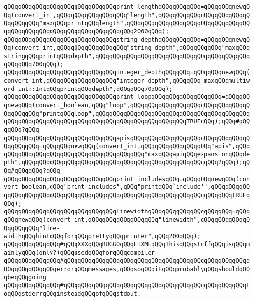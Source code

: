 \verb|qQQqqQQqqQQqqQQqqQQqqQQqqQQqqQQqprint_lengthqQQqqQQqqQQq=qQQqqQQqnewqQQq(convert_int,qQQqqQQqqQQqqQQqqQQq"length",qQQqqQQqqQQqqQQqqQQqqQQqqQQqqQQqqQQq"maxqQQqprintqQQqlength",qQQqqQQqqQQqqQQqqQQqqQQqqQQqqQQqqQQqqQQqqQQqqQQqqQQqqQQqqQQqqQQqqQQqqQQq2000qQQq);|\newline
\verb|qQQqqQQqqQQqqQQqqQQqqQQqqQQqqQQqstring_depthqQQqqQQqqQQq=qQQqqQQqnewqQQq(convert_int,qQQqqQQqqQQqqQQqqQQq"string_depth",qQQqqQQqqQQq"maxqQQqstringqQQqprintqQQqdepth",qQQqqQQqqQQqqQQqqQQqqQQqqQQqqQQqqQQqqQQqqQQqqQQqqQQq700qQQq);|\newline
\verb|qQQqqQQqqQQqqQQqqQQqqQQqqQQqqQQqinteger_depthqQQqqQQq=qQQqqQQqnewqQQq(convert_int,qQQqqQQqqQQqqQQqqQQq"integer_depth",qQQqqQQq"maxqQQqmultiword_int::IntqQQqprintqQQqdepth",qQQqqQQq70qQQq);|\newline
\verb|qQQqqQQqqQQqqQQqqQQqqQQqqQQqqQQqprint_loopqQQqqQQqqQQqqQQqqQQq=qQQqqQQqnewqQQq(convert_boolean,qQQq"loop",qQQqqQQqqQQqqQQqqQQqqQQqqQQqqQQqqQQqqQQqqQQq"printqQQqloop",qQQqqQQqqQQqqQQqqQQqqQQqqQQqqQQqqQQqqQQqqQQqqQQqqQQqqQQqqQQqqQQqqQQqqQQqqQQqqQQqqQQqqQQqqQQqqQQqTRUEqQQq);qQQq#qQQqqQQq?qQQq|\newline
\verb|qQQqqQQqqQQqqQQqqQQqqQQqqQQqqQQqapisqQQqqQQqqQQqqQQqqQQqqQQqqQQqqQQqqQQqqQQqqQQq=qQQqqQQqnewqQQq(convert_int,qQQqqQQqqQQqqQQqqQQq"apis",qQQqqQQqqQQqqQQqqQQqqQQqqQQqqQQqqQQqqQQqqQQq"maxqQQqapiqQQqexpansionqQQqdepth",qQQqqQQqqQQqqQQqqQQqqQQqqQQqqQQqqQQqqQQqqQQqqQQqqQQqqQQq2qQQq);qQQq#qQQqqQQq?qQQq|\newline
\verb|qQQqqQQqqQQqqQQqqQQqqQQqqQQqqQQqprint_includesqQQq=qQQqqQQqnewqQQq(convert_boolean,qQQq"print_includes",qQQq"printqQQq`include'",qQQqqQQqqQQqqQQqqQQqqQQqqQQqqQQqqQQqqQQqqQQqqQQqqQQqqQQqqQQqqQQqqQQqqQQqqQQqTRUEqQQq);|\newline
\verb|qQQqqQQqqQQqqQQqqQQqqQQqqQQqqQQqlinewidthqQQqqQQqqQQqqQQqqQQqqQQq=qQQqqQQqnewqQQq(convert_int,qQQqqQQqqQQqqQQqqQQq"linewidth",qQQqqQQqqQQqqQQqqQQqqQQq"line-widthqQQqhintqQQqforqQQqprettyqQQqprinter",qQQq200qQQq);|\newline
\newline
\verb|qQQqqQQqqQQqqQQq#qQQqXXXqQQqBUGGOqQQqFIXMEqQQqThisqQQqstuffqQQqisqQQqmainlyqQQq(only?)qQQqusedqQQqforqQQqcompiler|\newline
\verb|qQQqqQQqqQQqqQQq#qQQqqQQqqQQqqQQqqQQqqQQqqQQqqQQqqQQqqQQqqQQqqQQqqQQqqQQqqQQqqQQqqQQqerrorqQQqmessages,qQQqsoqQQqitqQQqprobablyqQQqshouldqQQqbeqQQqgoing|\newline
\verb|qQQqqQQqqQQqqQQq#qQQqqQQqqQQqqQQqqQQqqQQqqQQqqQQqqQQqqQQqqQQqqQQqqQQqtoqQQqstderrqQQqinsteadqQQqofqQQqstdout.|\newline
